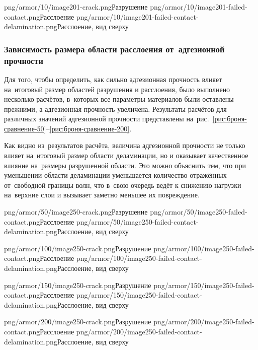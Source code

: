\documentclass[thesis.tex]{subfiles}
\begin{document}
           {png/armor/10/image201-crack.png}{Разрушение}
           {png/armor/10/image201-failed-contact.png}{Расслоение}
           {png/armor/10/image201-failed-contact-delamination.png}{Расслоение, вид сверху}

\subsubsection[Зависимость размера области расслоения\\от~адгезионной прочности]{Зависимость размера области расслоения от~адгезионной прочности}

Для того, чтобы определить, как сильно адгезионная прочность влияет на~итоговый размер областей разрушения и расслоения,
было выполнено несколько расчётов, в~которых все параметры материалов были оставлены прежними, а адгезионная прочность
увеличена. Результаты расчётов для различных значений адгезионной прочности представлены
на~рис.~\ref{рис:броня-сравнение-50}--\ref{рис:броня-сравнение-200}.

Как видно из~результатов расчёта, величина адгезионной прочности не только влияет на~итоговый размер области
деламинации, но и оказывает качественное влияние на~размеры разрушенной области. Это можно объяснить тем, что при
уменьшении области деламинации уменьшается количество отражённых от~свободной границы волн, что в~свою очередь ведёт к
снижению нагрузки на~верхние слои и вызывает заметно меньшее их повреждение.

          {png/armor/50/image250-crack.png}{Разрушение}
          {png/armor/50/image250-failed-contact.png}{Расслоение}
          {png/armor/50/image250-failed-contact-delamination.png}{Расслоение, вид сверху}

          {png/armor/100/image250-crack.png}{Разрушение}
          {png/armor/100/image250-failed-contact.png}{Расслоение}
          {png/armor/100/image250-failed-contact-delamination.png}{Расслоение, вид сверху}

          {png/armor/150/image250-crack.png}{Разрушение}
          {png/armor/150/image250-failed-contact.png}{Расслоение}
          {png/armor/150/image250-failed-contact-delamination.png}{Расслоение, вид сверху}

          {png/armor/200/image250-crack.png}{Разрушение}
          {png/armor/200/image250-failed-contact.png}{Расслоение}
          {png/armor/200/image250-failed-contact-delamination.png}{Расслоение, вид сверху}
\end{document}
